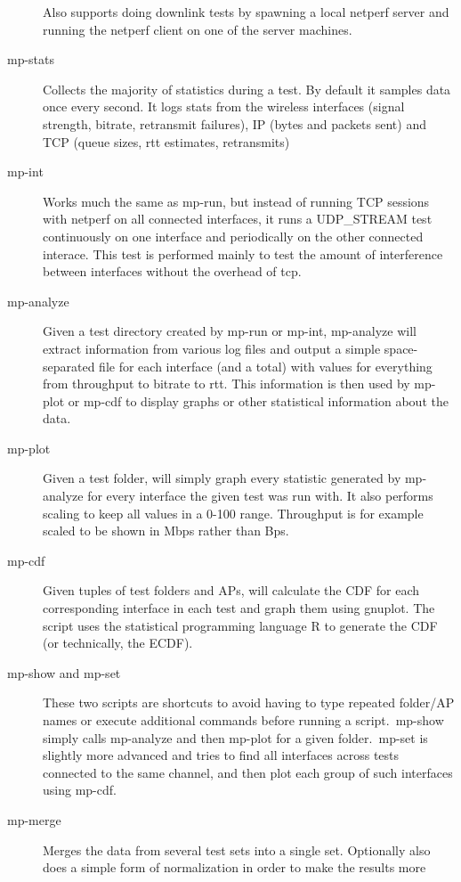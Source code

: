 \documentclass[12pt,a4paper]{article}
\begin{document}
\begin{description}
    Also supports doing downlink tests by spawning a local netperf server and
    running the netperf client on one of the server machines.
  \item[mp-stats]
    Collects the majority of statistics during a test. By default it samples
    data once every second. It logs stats from the wireless interfaces (signal
    strength, bitrate, retransmit failures), IP (bytes and packets sent) and TCP
    (queue sizes, rtt estimates, retransmits)
  \item[mp-int]
    Works much the same as mp-run, but instead of running TCP sessions with
    netperf on all connected interfaces, it runs a UDP\_STREAM test continuously
    on one interface and periodically on the other connected interace. This test
    is performed mainly to test the amount of interference between interfaces
    without the overhead of tcp.
  \item[mp-analyze]
    Given a test directory created by mp-run or mp-int, mp-analyze will extract
    information from various log files and output a simple space-separated file
    for each interface (and a total) with values for everything from throughput
    to bitrate to rtt. This information is then used by mp-plot or mp-cdf to
    display graphs or other statistical information about the data.
  \item[mp-plot]
    Given a test folder, will simply graph every statistic generated by
    mp-analyze for every interface the given test was run with. It also performs
    scaling to keep all values in a 0-100 range. Throughput is for example
    scaled to be shown in Mbps rather than Bps.
  \item[mp-cdf]
    Given tuples of test folders and APs, will calculate the CDF for each
    corresponding interface in each test and graph them using gnuplot. The
    script uses the statistical programming language R to generate the CDF (or
    technically, the ECDF).
  \item[mp-show and mp-set]
    These two scripts are shortcuts to avoid having to type repeated folder/AP
    names or execute additional commands before running a script.\ mp-show
    simply calls mp-analyze and then mp-plot for a given folder.\ mp-set is
    slightly more advanced and tries to find all interfaces across tests
    connected to the same channel, and then plot each group of such interfaces
    using mp-cdf.
  \item[mp-merge]
    Merges the data from several test sets into a single set. Optionally also
    does a simple form of normalization in order to make the results more

\end{description}
\end{document}

